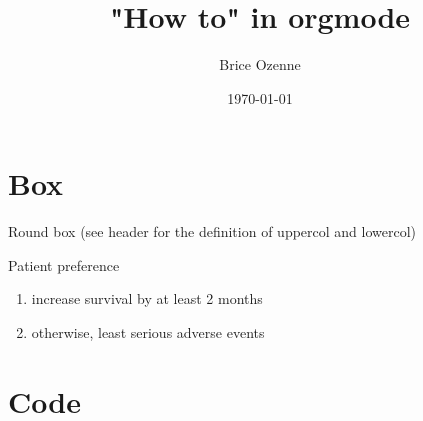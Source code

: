 \documentclass[table]{beamer}
\subtitle{}
\author{Brice Ozenne}
\date{\today}
\title{"How to" in orgmode}
\begin{document}
\maketitle

\section{Box}
\label{sec:org1d9b72e}

\begin{frame}[label={sec:orgf159a62}]{Round box}
(see header for the definition of uppercol and lowercol)

\begin{beamerboxesrounded}[upper=uppercol,lower=lowercol,shadow=true]
{Patient preference} 
\begin{enumerate}
\item increase survival by at least 2 months
\item otherwise, least serious adverse events
\end{enumerate}
\end{beamerboxesrounded}
\end{frame}

\section{Code}
\label{sec:org8731614}
\end{document}

